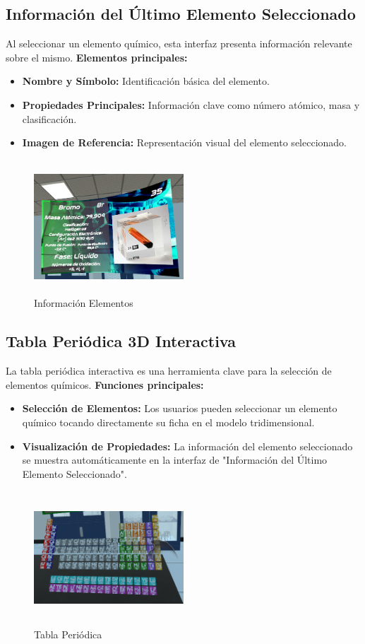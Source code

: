 \subsection{Información del Último Elemento Seleccionado}
Al seleccionar un elemento químico, esta interfaz presenta información relevante sobre el mismo.
\textbf{Elementos principales:}
\begin{itemize}
    \item \textbf{Nombre y Símbolo:} Identificación básica del elemento.
    \item \textbf{Propiedades Principales:} Información clave como número atómico, masa y clasificación.
    \item \textbf{Imagen de Referencia:} Representación visual del elemento seleccionado.
\end{itemize}
\begin{figure}[thbp]
    \centering
    \includegraphics[width=0.5\textwidth, height = 5cm]{img/GUI/UI_Elements.png}
    \caption{Información Elementos}
    \label{fig:Información_Elementos}
\end{figure}
\subsection{Tabla Periódica 3D Interactiva}
La tabla periódica interactiva es una herramienta clave para la selección de elementos químicos.
\textbf{Funciones principales:}
\begin{itemize}
    \item \textbf{Selección de Elementos:} Los usuarios pueden seleccionar un elemento químico tocando directamente su ficha en el modelo tridimensional.
    \item \textbf{Visualización de Propiedades:} La información del elemento seleccionado se muestra automáticamente en la interfaz de "Información del Último Elemento Seleccionado".
\end{itemize}
\begin{figure}[thbp]
    \centering
    \includegraphics[width=0.5\textwidth, height = 5cm]{img/GUI/Tabla_Periodica.png}
    \caption{Tabla Periódica}
    \label{fig:Tabla_Periódica}
\end{figure}
